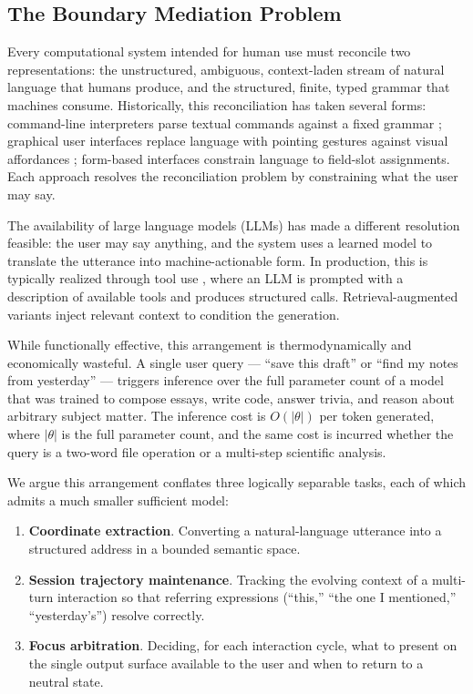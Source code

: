 \documentclass[11pt,twocolumn,a4paper]{article}
\theoremstyle{definition}
\theoremstyle{remark}
\begin{document}
\subsection{The Boundary Mediation Problem}

Every computational system intended for human use must reconcile two representations: the unstructured, ambiguous, context-laden stream of natural language that humans produce, and the structured, finite, typed grammar that machines consume. Historically, this reconciliation has taken several forms: command-line interpreters parse textual commands against a fixed grammar \citep{ritchie1978unix}; graphical user interfaces replace language with pointing gestures against visual affordances \citep{engelbart1962augmenting, sutherland1963sketchpad}; form-based interfaces constrain language to field-slot assignments. Each approach resolves the reconciliation problem by constraining what the user may say.

The availability of large language models (LLMs) \citep{brown2020gpt3, touvron2023llama, achiam2023gpt4} has made a different resolution feasible: the user may say anything, and the system uses a learned model to translate the utterance into machine-actionable form. In production, this is typically realized through tool use \citep{schick2024toolformer, yao2022react}, where an LLM is prompted with a description of available tools and produces structured calls. Retrieval-augmented variants \citep{lewis2020rag} inject relevant context to condition the generation.

While functionally effective, this arrangement is thermodynamically and economically wasteful. A single user query --- ``save this draft'' or ``find my notes from yesterday'' --- triggers inference over the full parameter count of a model that was trained to compose essays, write code, answer trivia, and reason about arbitrary subject matter. The inference cost is $O(|\theta|)$ per token generated, where $|\theta|$ is the full parameter count, and the same cost is incurred whether the query is a two-word file operation or a multi-step scientific analysis.

We argue this arrangement conflates three logically separable tasks, each of which admits a much smaller sufficient model:

\begin{enumerate}
    \item \textbf{Coordinate extraction}. Converting a natural-language utterance into a structured address in a bounded semantic space.
    \item \textbf{Session trajectory maintenance}. Tracking the evolving context of a multi-turn interaction so that referring expressions (``this,'' ``the one I mentioned,'' ``yesterday's'') resolve correctly.
    \item \textbf{Focus arbitration}. Deciding, for each interaction cycle, what to present on the single output surface available to the user and when to return to a neutral state.
\end{enumerate}
\end{document}
